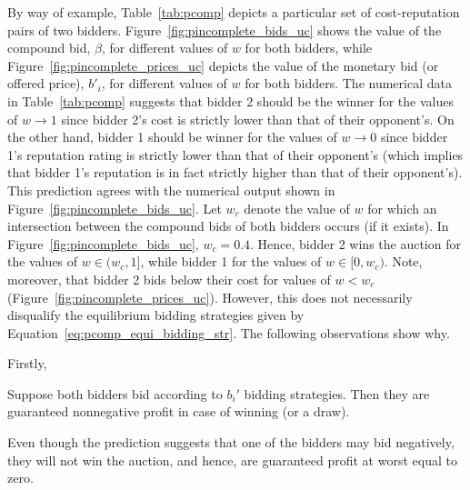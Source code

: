 By way of example, Table~\ref{tab:pcomp} depicts a particular set of cost-reputation pairs of two bidders. Figure~\ref{fig:pincomplete_bids_uc} shows the value of the compound bid, $\beta$, for different values of $w$ for both bidders, while Figure~\ref{fig:pincomplete_prices_uc} depicts the value of the monetary bid (or offered price), $b'_i$, for different values of $w$ for both bidders. The numerical data in Table~\ref{tab:pcomp} suggests that bidder 2 should be the winner for the values of $w\rightarrow 1$ since bidder 2's cost is strictly lower than that of their opponent's. On the other hand, bidder 1 should be winner for the values of $w\rightarrow 0$ since bidder 1's reputation rating is strictly lower than that of their opponent's (which implies that bidder 1's reputation is in fact strictly higher than that of their opponent's). This prediction agrees with the numerical output shown in Figure~\ref{fig:pincomplete_bids_uc}. Let $w_c$ denote the value of $w$ for which an intersection between the compound bids of both bidders occurs (if it exists). In Figure~\ref{fig:pincomplete_bids_uc}, $w_c=0.4$. Hence, bidder 2 wins the auction for the values of $w\in(w_c,1]$, while bidder 1 for the values of $w\in[0,w_c)$. Note, moreover, that bidder 2 bids below their cost for values of $w<w_c$ (Figure~\ref{fig:pincomplete_prices_uc}). However, this does not necessarily disqualify the equilibrium bidding strategies given by Equation~\eqref{eq:pcomp_equi_bidding_str}. The following observations show why.

Firstly,
\begin{proposition}
\label{prop:pcomp_negative_bids}
Suppose both bidders bid according to $b_i'$ bidding strategies. Then they are guaranteed nonnegative profit in case of winning (or a draw).
\end{proposition}
\noindent Even though the prediction suggests that one of the bidders may bid negatively, they will not win the auction, and hence, are guaranteed profit at worst equal to zero.

